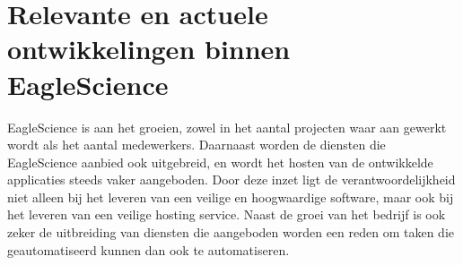 \section{Relevante en actuele ontwikkelingen binnen EagleScience}\label{sec:relevante-en-actuele-ontwikkelingen-binnen-EagleScience}

EagleScience is aan het groeien, zowel in het aantal projecten waar aan gewerkt wordt als het aantal medewerkers. Daarnaast worden de diensten die EagleScience aanbied ook uitgebreid, en wordt het hosten van de ontwikkelde applicaties steeds vaker aangeboden. Door deze inzet ligt de verantwoordelijkheid niet alleen bij het leveren van een veilige en hoogwaardige software, maar ook bij het leveren van een veilige hosting service. Naast de groei van het bedrijf is ook zeker de uitbreiding van diensten die aangeboden worden een reden om taken die geautomatiseerd kunnen dan ook te automatiseren.
